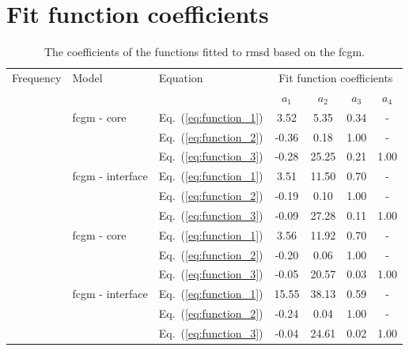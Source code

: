 \chapter{Fit function coefficients}
\label{app:fit_functions}
\begin{table}[ht]
	\small
	\tabcolsep=0.2cm
	\centering
	\caption{\label{tab:fit_fcgm_RMSD}The coefficients of the functions fitted to \acf{rmsd} based on the \acf{fcgm}.}
	\begin{tabular}{cllcccc}
		\toprule
		\multirow{2}{*}{Frequency} & \multirow{2}{*}{Model} & Equation & \multicolumn{4}{c}{Fit function coefficients}\\
		& & & \(a_1\) & \(a_2\) & \(a_3\) & \(a_4\)\\
		\midrule
		\multirow{6}{*}{\rotatebox[origin=c]{90}{50 \unit{\kHz}}} & \multirow{3}{*}{\ac{fcgm} - core} & Eq.~(\ref{eq:function_1}) & 3.52 & 5.35 & 0.34 &-\\
		& & Eq.~(\ref{eq:function_2}) & -0.36 & 0.18 & 1.00 & -\\
		& & Eq.~(\ref{eq:function_3}) & -0.28 & 25.25 & 0.21 & 1.00 \\
		\cline{2-7}
		& \multirow{3}{*}{\ac{fcgm} - interface} & Eq.~(\ref{eq:function_1}) & 3.51 & 11.50 & 0.70 &-\\
		& & Eq.~(\ref{eq:function_2}) & -0.19 & 0.10 & 1.00 &- \\
		& & Eq.~(\ref{eq:function_3}) & -0.09 & 27.28 & 0.11 & 1.00 \\
		\midrule
		\multirow{6}{*}{\rotatebox[origin=c]{90}{100 \unit{\kHz}}} & \multirow{3}{*}{\ac{fcgm} - core} & Eq.~(\ref{eq:function_1}) & 3.56 & 11.92 & 0.70 &-\\
		& & Eq.~(\ref{eq:function_2}) & -0.20 & 0.06 & 1.00 &- \\
		& & Eq.~(\ref{eq:function_3}) & -0.05 & 20.57 & 0.03 & 1.00 \\
		\cline{2-7}
		& \multirow{3}{*}{\ac{fcgm} - interface} & Eq.~(\ref{eq:function_1}) & 15.55 & 38.13 & 0.59 &- \\
		& & Eq.~(\ref{eq:function_2}) & -0.24 & 0.04 & 1.00 & -\\
		& & Eq.~(\ref{eq:function_3}) & -0.04 & 24.61 & 0.02 & 1.00 \\
		\bottomrule
	\end{tabular}
\end{table}

